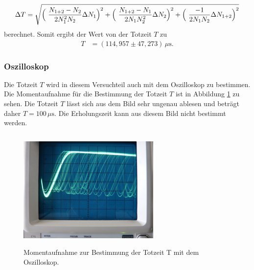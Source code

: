   \begin{align*}
   \Delta T =\sqrt{\Bigl(\ \frac{N_{1+2}-N_2}{2N_1^2 N_2} \Delta N_1\Bigr)^2+\Bigl(\ \frac{N_{1+2}-N_1}{2N_1 N_2^2} \Delta N_2 \Bigr)^2+\Bigl(\ \frac{-1}{2N_1N_2} \Delta N_{1+2}\Bigr)^2}
  \end{align*}
  berechnet.
  Somit ergibt der Wert von der Totzeit $T$ zu
  \begin{align*}
    T &=(114,957 \pm 47,273)\, \mu \text{s}.
   \end{align*}


  
\subsubsection{Oszilloskop}
Die Totzeit $T$ wird in diesem Versuchteil auch mit dem Oszilloskop zu bestimmen.
Die Momentaufnahme für die Bestimmung der Totzeit $T$ ist in Abbildung \ref{fig:Oszilloskop} zu sehen.
Die Totzeit $T$ lässt sich aus dem Bild sehr ungenau ablesen und beträgt daher \( T=100\,\mu \text{s}.\)
Die  Erholungszeit  kann  aus  diesem  Bild nicht bestimmt werden.
\begin{figure}[H]
  \begin{center}
  \includegraphics[width = 7cm, height= 6cm]{Oszilloskop.png}
  \caption{Momentaufnahme zur Bestimmung der Totzeit T mit dem Oszilloskop.\protect\cite{AL}}
  \label{fig:Oszilloskop}
  \end{center}
  \end{figure}

